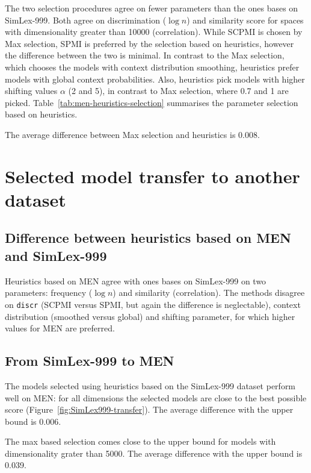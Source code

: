 The two selection procedures agree on fewer parameters than the ones bases on SimLex-999. Both agree on discrimination ($\log n$) and similarity score for spaces with dimensionality greater than 10000 (correlation). While SCPMI is chosen by Max selection, SPMI is preferred by the selection based on heuristics, however the difference between the two is minimal. In contrast to the Max selection, which chooses the models with context distribution smoothing, heuristics prefer models with global context probabilities. Also, heuristics pick models with higher shifting values $\alpha$ (2 and 5), in contrast to Max selection, where 0.7 and 1 are picked. Table~\ref{tab:men-heuristics-selection} summarises the parameter selection based on heuristics.

The average difference between Max selection and heuristics is 0.008.

\section{Selected model transfer to another dataset}
\label{sec:select-model-transf}

\subsection{Difference between heuristics based on MEN and SimLex-999}

Heuristics based on MEN agree with ones bases on SimLex-999 on two parameters: frequency ($\log n$) and similarity (correlation). The methods disagree on \texttt{discr} (SCPMI versus SPMI, but again the difference is neglectable), context distribution (smoothed versus global) and shifting parameter, for which higher values for MEN are preferred.

\subsection{From SimLex-999 to MEN}



The models selected using heuristics based on the SimLex-999 dataset perform well on MEN: for all dimensions the selected models are close to the best possible score (Figure~\ref{fig:SimLex999-transfer}). The average difference with the upper bound is 0.006.

The max based selection comes close to the upper bound for models with dimensionality grater than 5000. The average difference with the upper bound is 0.039.


